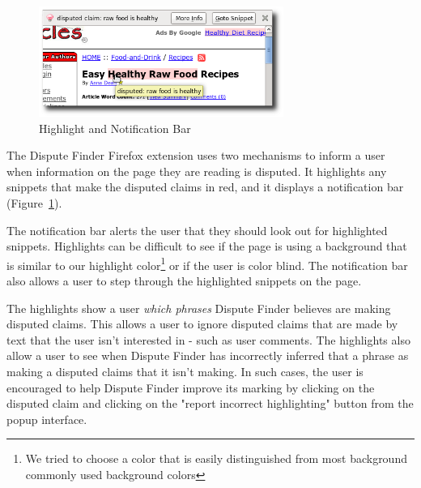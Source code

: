 \documentclass{www2010-submission}
\begin{document}
\begin{figure}[tb]
	\begin{center}
	\includegraphics[width=8cm]{pictures/highlight_bar.png}
	\caption{Highlight and Notification Bar}
	\label{highlight_bar}
	\end{center}
\end{figure}

%
%

The Dispute Finder Firefox extension uses two mechanisms to inform a user when information on the page they are reading is disputed. It highlights any snippets that make the disputed claims in red, and it displays a notification bar (Figure~\ref{highlight_bar}). 

The notification bar alerts the user that they should look out for highlighted snippets. Highlights can be difficult to see if the page is using a background that is similar to our highlight color\footnote{We tried to choose a color that is easily distinguished from most background commonly used background colors} or if the user is color blind. The notification bar also allows a user to step through the highlighted snippets on the page.

The highlights show a user {\it which phrases} Dispute Finder believes are making disputed claims. This allows a user to ignore disputed claims that are made by text that the user isn't interested in - such as user comments. The highlights also allow a user to see when Dispute Finder has incorrectly inferred that a phrase as making a disputed claims that it isn't making. In such cases, the user is encouraged to help Dispute Finder improve its marking by clicking on the disputed claim and clicking on the "report incorrect highlighting" button from the popup interface.
\end{document}
